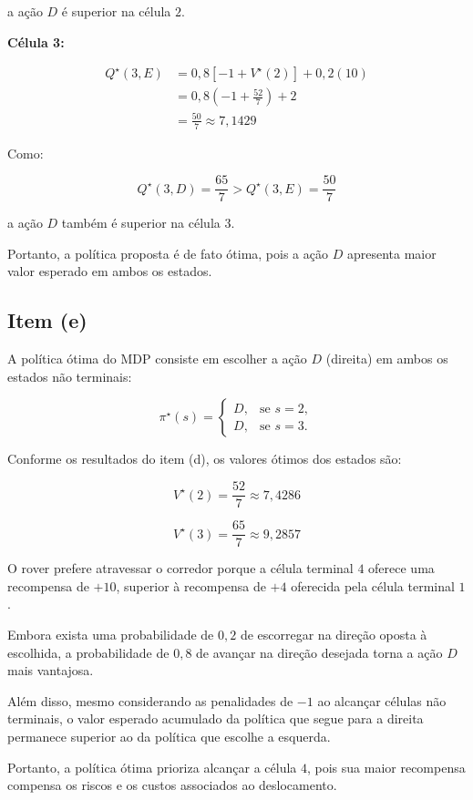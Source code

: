 a ação $D$ é superior na célula $2$.

\textbf{Célula 3:}

\[
\begin{aligned}
Q^\star(3,E)
&=0{,}8[-1+V^\star(2)]+0{,}2(10)\\
&=0{,}8\left(-1+\frac{52}{7}\right)+2\\
&=\frac{50}{7}\approx7{,}1429
\end{aligned}
\]

Como:

\[
Q^\star(3,D)=\frac{65}{7}
>
Q^\star(3,E)=\frac{50}{7}
\]

a ação $D$ também é superior na célula $3$.

Portanto, a política proposta é de fato
ótima, pois a ação $D$ apresenta maior
valor esperado em ambos os estados.


\subsection{Item (e)}

A política ótima do MDP consiste em escolher
a ação $D$ (direita) em ambos os estados
não terminais:

\[
\boxed{
\pi^\star(s)=
\begin{cases}
D, & \text{se } s=2,\\
D, & \text{se } s=3.
\end{cases}
}
\]

Conforme os resultados do item (d), os valores
ótimos dos estados são:

\[
V^\star(2)=\frac{52}{7}\approx7{,}4286
\]

\[
V^\star(3)=\frac{65}{7}\approx9{,}2857
\]

O rover prefere atravessar o corredor porque
a célula terminal $4$ oferece uma recompensa
de $+10$, superior à recompensa de $+4$
oferecida pela célula terminal $1$.

Embora exista uma probabilidade de $0{,}2$
de escorregar na direção oposta à escolhida,
a probabilidade de $0{,}8$ de avançar
na direção desejada torna a ação $D$
mais vantajosa.

Além disso, mesmo considerando as penalidades
de $-1$ ao alcançar células não terminais,
o valor esperado acumulado da política
que segue para a direita permanece superior
ao da política que escolhe a esquerda.

Portanto, a política ótima prioriza
alcançar a célula $4$, pois sua maior
recompensa compensa os riscos e os custos
associados ao deslocamento.



